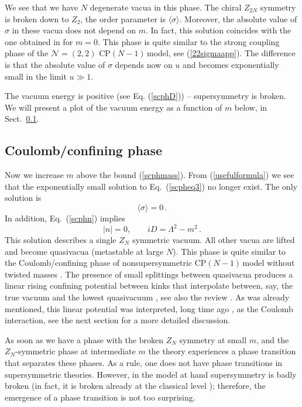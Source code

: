 \documentclass[epsfig,12pt]{article}
\def\beq{\begin{equation}}
\def\eeq{\end{equation}}
\newcommand{\cpn}{CP$(N-1)\,$}
\def\beq{\begin{equation}}
\def\eeq{\end{equation}}
\newcommand{\ntwot}{${\mathcal N}= \left(2,2\right) $ }
\begin{document}
{We see that we have $N$ degenerate vacua in this phase. The  chiral $Z_{2N}$ symmetry is broken
down to $Z_2$, the order parameter is $\langle \sigma\rangle$. Moreover, the absolute 
value of $\sigma$ in these vacua does not depend on $m$.
In fact, this solution coincides with the one obtained in \cite{SYhet} for $m=0$. This phase
is quite similar to the strong coupling phase of  the \ntwot \cpn model, see (\ref{22sigmaapp}).
The difference is that the absolute value of $\sigma$ depends now on $u$ and becomes exponentially
small in the limit $u\gg 1$.

The vacuum energy is positive (see Eq. (\ref{scphD})) --  supersymmetry is broken.
We will present a plot of the vacuum energy as a function of $m$ below, in Sect.~\ref{subscoulco}.

\subsection{Coulomb/confining phase}
\label{subscoulco}

Now we increase $m$ above the bound (\ref{scphmass}). From (\ref{usefulformula}) we see that the 
exponentially small solution to Eq.~(\ref{scpheq3}) no longer exist. The only solution is
\beq
\langle \sigma\rangle=0\,.
\label{confsigma}
\eeq
In addition, Eq.~(\ref{scphn}) implies
\beq
|n|=0,\qquad iD= \Lambda^2-m^2\,.
\label{confnD}
\eeq
This solution describes a single $Z_N$ symmetric vacuum. All other vacua are lifted
and become quasivacua (metastable at large $N$). This phase is quite similar to the Coulomb/confining phase
of nonsupersymmetric \cpn model without twisted masses \cite{W79}. The presence 
of small splittings between quasivacua produces a linear rising confining potential between kinks
that interpolate between, say, the true vacuum and the lowest quasivacuum \cite{GSY05},
see also the review \cite{SYrev}.
As was already mentioned, this linear potential was  interpreted, long time ago \cite{Coleman,W79}, as the
 Coulomb interaction,
 see the next section for a more detailed discussion.

As soon as we have a phase with 
the broken $Z_N$ symmetry at small $m$,
 and the $Z_N$-symmetric phase at
intermediate $m$ the theory experiences
a phase transition that separates these phases. As a rule, 
one does not 
have phase transitions in supersymmetric theories. However, in the model at hand  supersymmetry is
badly broken (in fact, it is broken already at the classical level \cite{BSY3}); therefore, the emergence of 
a phase transition is not too surprising. 

}
\end{document}

